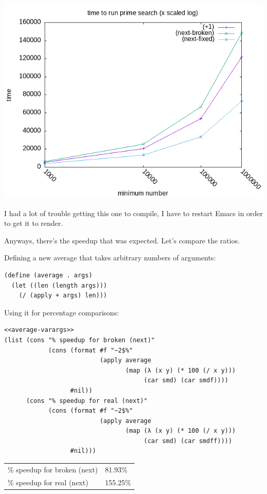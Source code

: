 \documentclass[final,fleqn,titlepage]{article}
\begin{document}
\begin{center}
\includegraphics[width=.9\linewidth]{fig/1-22-3.png}
\end{center}

I had a lot of trouble getting this one to compile, I have to restart Emacs in
order to get it to render.

Anyways, there's the speedup that was expected. Let's compare the ratios.

Defining a new average that takes arbitrary numbers of arguments:
\begin{verbatim}
(define (average . args)
  (let ((len (length args)))
    (/ (apply + args) len)))
\end{verbatim}

Using it for percentage comparisons:
\begin{verbatim}
<<average-varargs>>
(list (cons "% speedup for broken (next)"
            (cons (format #f "~2$%"
                          (apply average
                                 (map (λ (x y) (* 100 (/ x y)))
                                      (car smd) (car smdf))))
                  #nil))
      (cons "% speedup for real (next)"
            (cons (format #f "~2$%"
                          (apply average
                                 (map (λ (x y) (* 100 (/ x y)))
                                      (car smd) (car smdff))))
                  #nil)))
\end{verbatim}

\begin{center}
\begin{tabular}{ll}
\% speedup for broken (next) & 81.93\%\\
\% speedup for real (next) & 155.25\%\\
\end{tabular}
\end{center}
\end{document}
